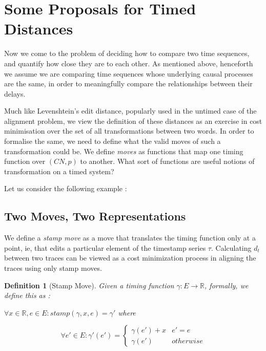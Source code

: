 \documentclass{article}
\newcounter{cases}
\theoremstyle{Definition}
\newtheorem{definition}{Definition}
\theoremstyle{definition}
\begin{document}
	\section{Some Proposals for Timed Distances} 
	
	Now we come to the problem of deciding how to compare two time sequences, and quantify how close they are to each other. 
	As mentioned above, henceforth we assume we are comparing time sequences whose underlying causal processes are the same, in order to meaningfully compare the relationships between their delays. 
	
	Much like Levenshtein's edit distance, popularly used in the untimed case of the alignment problem, we view the definition of these distances as an exercise in cost minimisation over the set of all transformations between two words. 
	In order to formalise the same, we need to define what the valid moves of such a transformation could be. 
	We define \textit{moves} as functions that map one timing function over $(CN, p)$ to another. 
	What sort of functions are useful notions of transformation on a timed system? 
	
	Let us consider the following example : 
	
	\subsection{Two Moves, Two Representations} \label{dualrep}
	
	We define a \textit{stamp move} as a move that translates the timing function only at a point, ie, that edits a particular element of the timestamp series $\tau$. 
	Calculating $d_t$ between two traces can be viewed as a cost minimization process in aligning the traces using only stamp moves. 
	
	\begin{definition}[Stamp Move]
		Given a timing function $\gamma : E \to \mathbb{R}$, formally, we define this as : 
	
	$\forall x \in \mathbb{R}, e \in E : stamp(\gamma, x, e) =\gamma' $ where
	
	$$\forall e' \in E : \gamma'(e')  = \begin{cases}
		\gamma(e') + x & e' = e \\
		\gamma(e')& otherwise
	\end{cases}$$
	
	\end{definition}
\end{document}
